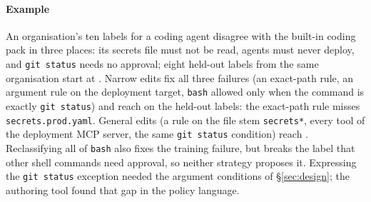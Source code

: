 \paragraph{Example}
An organisation's ten labels for a coding agent disagree with the built-in coding pack in three places: its secrets file must not be read, agents must never deploy, and \texttt{git status} needs no approval; eight held-out labels from the same organisation start at \AuExHoldoutBefore{}. Narrow edits fix all three failures (an exact-path rule, an argument rule on the deployment target, \texttt{bash} allowed only when the command is exactly \texttt{git status}) and reach \AuExNarrowHoldout{} on the held-out labels: the exact-path rule misses \texttt{secrets.prod.yaml}. General edits (a rule on the file stem \texttt{secrets*}, every tool of the deployment MCP server, the same \texttt{git status} condition) reach \AuExGeneralHoldout{}. Reclassifying all of \texttt{bash} also fixes the training failure, but breaks the label that other shell commands need approval, so neither strategy proposes it. Expressing the \texttt{git status} exception needed the argument conditions of \S\ref{sec:design}; the authoring tool found that gap in the policy language.
